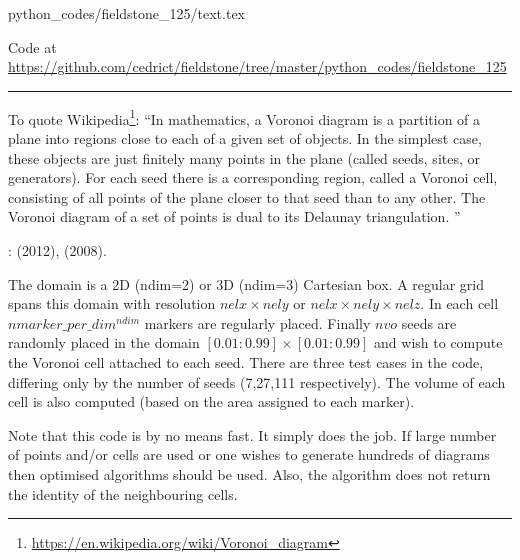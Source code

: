 \begin{flushright} {\tiny {\color{gray} python\_codes/fieldstone\_125/text.tex}} \end{flushright}

%

\begin{center}

Code at \url{https://github.com/cedrict/fieldstone/tree/master/python_codes/fieldstone_125}
\end{center}

\par\noindent\rule{\textwidth}{0.4pt}



To quote Wikipedia\footnote{\url{https://en.wikipedia.org/wiki/Voronoi_diagram}}:
``In mathematics, a Voronoi diagram is a partition of a plane into regions close to each of a given set of objects. 
In the simplest case, these objects are just finitely many points in the plane (called seeds, sites, or generators). 
For each seed there is a corresponding region, called a Voronoi cell, consisting of all points of the plane closer to 
that seed than to any other. The Voronoi diagram of a set of points is dual to its Delaunay triangulation. ''

\Literature: \textcite{may12} (2012), \textcite{hust08b} (2008).

The domain is a 2D ({\python ndim=2}) or 3D ({\python ndim=3}) 
Cartesian box. A regular grid spans this domain with resolution 
$nelx \times nely$ or $nelx \times nely \times nelz$. 
In each cell $nmarker\_per\_dim^{ndim}$ markers are regularly placed. 
Finally $nvo$ seeds are randomly placed in the domain $[0.01:0.99]\times[0.01:0.99]$ 
and wish to compute the Voronoi cell attached to 
each seed. There are three test cases in the code, differing only by the number of seeds (7,27,111 respectively).
The volume of each cell is also computed (based on the area assigned to each marker).

Note that this code is by no means fast. It simply does the job. If large number of points and/or cells are 
used or one wishes to generate hundreds of diagrams then optimised algorithms should be used. 
Also, the algorithm does not return the identity of the neighbouring cells.

